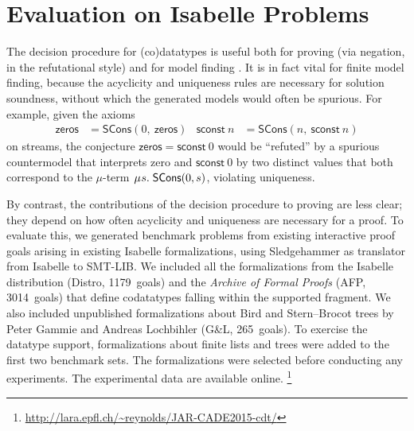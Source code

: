 \documentclass[smallcondensed,draft]{svjour3}
\newcommand\MU{\vvthinspace\mu\vvthinspace}
\newcommand\const[1]{\textsf{#1}}
\newcommand\vvthinspace{\kern+0.041667em}
\begin{document}
\section{Evaluation on Isabelle Problems}
\label{sec:evaluation-on-isabelle-problems}

\newcommand\gandl{G\&L}
\newcommand\HD[1]{\hbox to2em{\footnotesize\hfill\!\!\!\!#1\!\!\!\!\hfill}}

The decision procedure for (co)datatypes is useful both for proving (via
negation, in the refutational style) and for model finding
\cite{reynolds-et-al-2013,ge-de-moura-2009}.
It is in fact vital for finite model finding,
because the acyclicity and uniqueness rules are necessary for solution
soundness, without which the generated models would often be
spurious. For example, given the axioms
\begin{align*}
\const{zeros} & = \const{SCons}(0,\:\const{zeros})
& \const{sconst}~n & = \const{SCons}(n,\:\const{sconst}~n)
\end{align*}
on streams, the conjecture
$\const{zeros} = \const{sconst}~0$
would be ``refuted'' by a spurious countermodel that interprets
\const{zero} and $\const{sconst}~0$ by two distinct
values that both correspond to the \hbox{$\mu$-term}
$\MU s.\; \const{SCons}(0, s)$,
violating uniqueness.

By contrast, the contributions of the decision procedure
to proving are less clear; they depend on how
often acyclicity and uniqueness are necessary for a proof.
To evaluate this,
we generated benchmark problems from existing interactive
proof goals arising in existing
Isabelle formalizations, using Sledgehammer \cite{blanchette-et-al-2013-smt}
as translator from Isabelle to SMT-LIB.
We
included all the formalizations from the Isabelle distribution (Distro, 1179~goals)
and the \emph{Archive of Formal Proofs} (AFP, 3014~goals) \cite{klein-et-al-afp}
that define codatatypes falling within the supported fragment. We
also included unpublished formalizations about Bird and Stern--Brocot trees
by Peter Gammie and Andreas Lochbihler (\gandl,
265~goals). To exercise the datatype support, formalizations about finite
lists and trees
were added to the first two benchmark sets. The formalizations were selected before
conducting any experiments. The experimental data are available
online.%
\footnote{\url{http://lara.epfl.ch/~reynolds/JAR-CADE2015-cdt/}}
\end{document}
